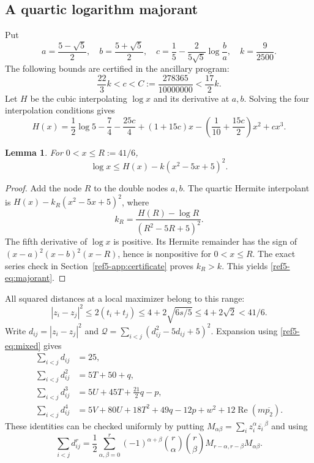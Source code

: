 \documentclass[11pt]{article}
\newtheorem{lemma}[theorem]{Lemma}
\theoremstyle{remark}
\newcommand{\Rea}{\operatorname{Re}}
\numberwithin{equation}{section}
\begin{document}
\subsection{A quartic logarithm majorant}
Put
\begin{equation}\label{ref5-eq:majorant-constants}
 a=\frac{5-\sqrt5}{2},\quad b=\frac{5+\sqrt5}{2},\quad
 c=\frac15-\frac{2}{5\sqrt5}\log\frac ba,\quad k=\frac9{2500}.
\end{equation}
The following bounds are certified in the ancillary program:
\begin{equation}\label{ref5-eq:c-bounds}
 \frac{22}{3}k<c<C:=\frac{278365}{10000000}<\frac{17}{2}k.
\end{equation}
Let $H$ be the cubic interpolating $\log x$ and its derivative at $a,b$.
Solving the four interpolation conditions gives
\begin{equation}\label{ref5-eq:H}
 H(x)=\frac12\log5-\frac74-\frac{25c}{4}
 +(1+15c)x-\left(\frac1{10}+\frac{15c}{2}\right)x^2+cx^3.
\end{equation}

\begin{lemma}\label{ref5-lem:majorant}
For $0<x\le R:=41/6$,
\begin{equation}\label{ref5-eq:majorant}
 \log x\le H(x)-k(x^2-5x+5)^2.
\end{equation}
\end{lemma}
\begin{proof}
Add the node $R$ to the double nodes $a,b$.
The quartic Hermite interpolant is
$H(x)-k_R(x^2-5x+5)^2$, where
\[
 k_R=\frac{H(R)-\log R}{(R^2-5R+5)^2}.
\]
The fifth derivative of $\log x$ is positive.
Its Hermite remainder has the sign of
$(x-a)^2(x-b)^2(x-R)$, hence is nonpositive for $0<x\le R$.
The exact series check in Section~\ref{ref5-app:certificate} proves
$k_R>k$. This yields \eqref{ref5-eq:majorant}.
\end{proof}

All squared distances at a local maximizer belong to this range:
\[
 |z_i-z_j|^2\le2(t_i+t_j)
 \le4+2\sqrt{6s/5}\le4+2\sqrt2<41/6.
\]
Write $d_{ij}=|z_i-z_j|^2$ and
$\mathcal Q=\sum_{i<j}(d_{ij}^2-5d_{ij}+5)^2$.
Expansion using \eqref{ref5-eq:mixed} gives
\begin{equation}\label{ref5-eq:distance-moments}
\begin{aligned}
 \sum_{i<j}d_{ij}&=25,\\
 \sum_{i<j}d_{ij}^2&=5T+50+q,\\
 \sum_{i<j}d_{ij}^3&=5U+45T+\frac{21}{2}q-p,\\
 \sum_{i<j}d_{ij}^4&=5V+80U+18T^2+49q-12p+w^2
                 +12\Rea(m\overline{p_2}).
\end{aligned}
\end{equation}
These identities can be checked uniformly by putting
$M_{\alpha\beta}=\sum_i z_i^\alpha\overline{z_i}^{\,\beta}$ and using
\begin{equation}\label{ref5-eq:moment-expansion}
 \sum_{i<j}d_{ij}^r=
 \frac12\sum_{\alpha,\beta=0}^r(-1)^{\alpha+\beta}
 \binom r\alpha\binom r\beta
 M_{r-\alpha,r-\beta}M_{\alpha\beta}.
\end{equation}
\end{document}
